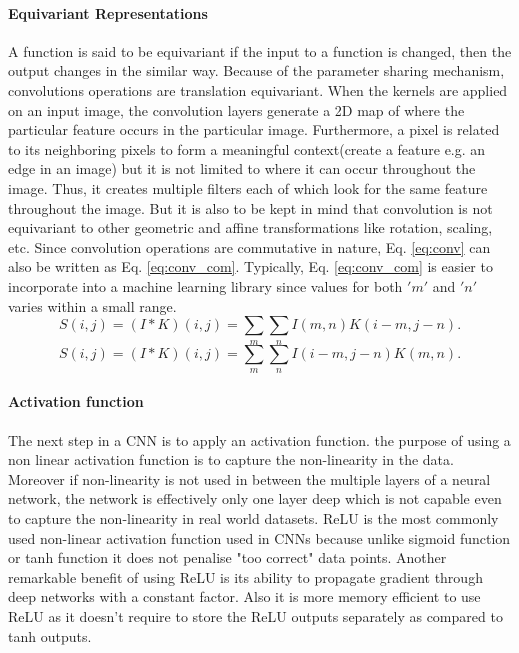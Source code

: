 \paragraph{Equivariant Representations} 
A function is said to be equivariant if the input to a function is changed, then the output changes in the similar way. Because of the parameter sharing mechanism, convolutions operations are translation equivariant. When the kernels are applied on an input image, the convolution layers generate a 2D map of where the particular feature occurs in the particular image. Furthermore, a pixel is related to its neighboring pixels to form a meaningful context(create a feature e.g. an edge in an image) but it is not limited to where it can occur throughout the image. Thus, it creates multiple filters each of which look for the same feature throughout the image. But it is also to be kept in mind that convolution is not equivariant to other geometric and affine transformations like rotation, scaling, etc. 
 Since convolution operations are commutative in nature, Eq. \ref{eq:conv} can also be written as Eq. \ref{eq:conv_com}. Typically, Eq. \ref{eq:conv_com} is easier to incorporate into a machine learning library since values for both $'m'$ and $'n'$ varies within a small range.\cite{Goodfellow-et-al-2016}
\begin{equation}
    \label{eq:conv}
    \mathit{S(i,j)}= \mathit{(I*K)(i,j)} = \sum_{m}\sum_{n}\mathit{I(m,n)K(i-m,j-n)}.
\end{equation}
\begin{equation}
    \label{eq:conv_com}
    \mathit{S(i,j)}= \mathit{(I*K)(i,j)} = \sum_{m}\sum_{n}\mathit{I(i-m,j-n)K(m,n)}.
\end{equation}
\paragraph{Activation function}
The next step in a \ac{CNN} is to apply an activation function. the purpose of using a non linear activation function is to capture the non-linearity in the data. Moreover if non-linearity is not used in between the multiple layers of a neural network, the network is effectively only one layer deep which is not capable even to capture the non-linearity in real world datasets. \ac{ReLU} is the most commonly used non-linear activation function used in \ac{CNN}s because unlike sigmoid function or tanh function it does not penalise "too correct" data points. Another remarkable benefit of using \ac{ReLU} is its ability to propagate gradient through deep networks with a constant factor. Also it is more memory efficient to use \ac{ReLU} as it doesn't require to store the \ac{ReLU} outputs separately as compared to tanh outputs.\cite{Goodfellow-et-al-2016}
